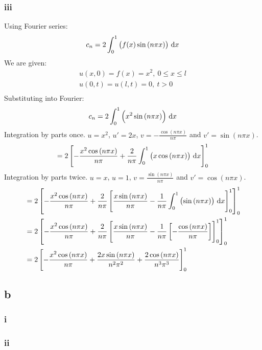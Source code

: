 \documentclass[11pt]{article}
\numberwithin{equation}{section}
\begin{document}
\subsubsection*{iii}
Using Fourier series:
\begin{align}
	c_n = 2\int_{0}^{1} \left(f(x)\sin\left(n\pi x\right)\right) \,\dif x 
\end{align}
We are given:
\begin{align}
	u(x,0) = f(x) = x^2, \ 0 \leq x \leq l\\
	u(0,t) = u(l,t) = 0, \ t > 0\\
\end{align}
Substituting into Fourier:
\begin{align}
	c_n = 2 \int_{0}^{1} \left( x^2 \sin\left(n\pi x\right) \right) \,\dif x \\
\end{align}
Integration by parts once. $u = x^2$, $u' = 2x$, $v = -\frac{\cos\left(n\pi x\right)}{n\pi}$ and $v' = \sin\left(n\pi x\right)$.
\begin{align}
	= 2\left[ -\frac{x^2 \cos\left(n\pi x\right)}{n\pi} + \frac{2}{n\pi}\int_{0}^{1} \left(x\cos\left(n\pi x\right)\right) \,\dif x \right]_0^1
\end{align} 
Integration by parts twice. $u = x$, $u = 1$, $v= \frac{\sin\left(n\pi x\right)}{n\pi}$ and $v' = \cos\left(n\pi x\right)$.
\begin{align}
	&= 2\left[ -\frac{x^2 \cos\left(n\pi x\right)}{n\pi} + \frac{2}{n\pi}\left[ \frac{x\sin\left(n\pi x\right)}{n\pi} - \frac{1}{n\pi} \int_{0}^{1} \left(\sin\left(n\pi x\right)\right) \,\dif x \right]_0^1 \right]_0^1\\
	&= 2\left[ -\frac{x^2 \cos\left(n\pi x\right)}{n\pi} + \frac{2}{n\pi}\left[ \frac{x\sin\left(n\pi x\right)}{n\pi} - \frac{1}{n\pi} \left[ -\frac{\cos\left(n\pi x\right)}{n\pi} \right] \right]_0^1 \right]_0^1\\
	&= 2\left[ -\frac{x^2 \cos\left(n\pi x\right)}{n\pi} + \frac{2x\sin\left(n\pi x\right)}{n^2\pi^2} + \frac{2\cos\left(n\pi x\right)}{n^3\pi^3} \right]_0^1\\
\end{align}
\subsection*{b}
\subsubsection*{i}
\subsubsection*{ii}
\end{document}
